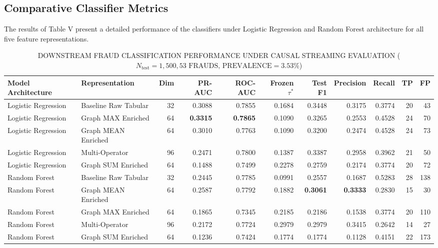 \documentclass[journal]{IEEEtran}
\begin{document}
\subsection{Comparative Classifier Metrics}
The results of Table V present a detailed performance of the classifiers under Logistic Regression and Random Forest architecture for all five feature representations.

\begin{table}[!t]
\centering
\caption{DOWNSTREAM FRAUD CLASSIFICATION PERFORMANCE UNDER CAUSAL STREAMING EVALUATION ($N_{\text{test}} = 1,500, 53\text{ FRAUDS, PREVALENCE} = 3.53\%$)}
\label{tab:downstream}
\begin{tabular}{llrrrrrrrrr}
\toprule
\textbf{Model Architecture} & \textbf{Representation} & \textbf{Dim} & \textbf{PR-AUC} & \textbf{ROC-AUC} & \textbf{Frozen }$\tau^*$ & \textbf{Test F1} & \textbf{Precision} & \textbf{Recall} & \textbf{TP} & \textbf{FP} \\
\midrule
Logistic Regression & Baseline Raw Tabular & 32 & 0.3088 & 0.7855 & 0.1684 & 0.3448 & 0.3175 & 0.3774 & 20 & 43 \\
Logistic Regression & Graph MAX Enriched   & 64 & \textbf{0.3315} & \textbf{0.7865} & 0.1090 & 0.3265 & 0.2553 & 0.4528 & 24 & 70 \\
Logistic Regression & Graph MEAN Enriched  & 64 & 0.3010 & 0.7763 & 0.1090 & 0.3200 & 0.2474 & 0.4528 & 24 & 73 \\
Logistic Regression & Multi-Operator       & 96 & 0.2471 & 0.7800 & 0.1387 & 0.3387 & 0.2958 & 0.3962 & 21 & 50 \\
Logistic Regression & Graph SUM Enriched   & 64 & 0.1488 & 0.7499 & 0.2278 & 0.2759 & 0.2174 & 0.3774 & 20 & 72 \\
\midrule
Random Forest       & Baseline Raw Tabular & 32 & 0.2445 & 0.7785 & 0.0991 & 0.2557 & 0.1687 & 0.5283 & 28 & 138 \\
Random Forest       & Graph MEAN Enriched  & 64 & 0.2587 & 0.7792 & 0.1882 & \textbf{0.3061} & \textbf{0.3333} & 0.2830 & 15 & 30 \\
Random Forest       & Graph MAX Enriched   & 64 & 0.1865 & 0.7345 & 0.2185 & 0.2186 & 0.1538 & 0.3774 & 20 & 110 \\
Random Forest       & Multi-Operator       & 96 & 0.2172 & 0.7724 & 0.2979 & 0.2979 & 0.3415 & 0.2642 & 14 & 27 \\
Random Forest       & Graph SUM Enriched   & 64 & 0.1236 & 0.7424 & 0.1774 & 0.1774 & 0.1128 & 0.4151 & 22 & 173 \\
\bottomrule
\end{tabular}
\end{table}
\end{document}
